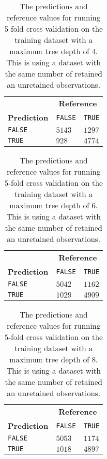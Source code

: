 \begin{table}[H]
  \centering
  \begin{tabular}{l|ll}
    \multicolumn{1}{c|}{} & \multicolumn{2}{c}{\textbf{Reference}} \\
    \textbf{Prediction}   & \texttt{FALSE}       & \texttt{TRUE}   \\ \cline{2-3} 
    \texttt{FALSE}        & $5143$               & $1297$          \\
    \texttt{TRUE}         &  $928$               & $4774$           
  \end{tabular}
  \caption{The predictions and reference values for running 5-fold cross
    validation on the training dataset with a maximum tree depth of 4. This is
    using a dataset with the same number of retained an unretained observations.}
  \label{app:tab:confusion11}
\end{table}

\begin{table}[H]
  \centering
  \begin{tabular}{l|ll}
    \multicolumn{1}{c|}{} & \multicolumn{2}{c}{\textbf{Reference}} \\
    \textbf{Prediction}   & \texttt{FALSE}       & \texttt{TRUE}   \\ \cline{2-3} 
    \texttt{FALSE}        & $5042$               & $1162$          \\
    \texttt{TRUE}         & $1029$               & $4909$           
  \end{tabular}
  \caption{The predictions and reference values for running 5-fold cross
    validation on the training dataset with a maximum tree depth of 6. This is
    using a dataset with the same number of retained an unretained observations.}
  \label{app:tab:confusion22}
\end{table}

\begin{table}[H]
  \centering
  \begin{tabular}{l|ll}
    \multicolumn{1}{c|}{} & \multicolumn{2}{c}{\textbf{Reference}} \\
    \textbf{Prediction}   & \texttt{FALSE}       & \texttt{TRUE}   \\ \cline{2-3} 
    \texttt{FALSE}        & $5053$               & $1174$          \\
    \texttt{TRUE}         & $1018$               & $4897$           
  \end{tabular}
  \caption{The predictions and reference values for running 5-fold cross
    validation on the training dataset with a maximum tree depth of 8. This is
    using a dataset with the same number of retained an unretained observations.}
  \label{app:tab:confusion33}
\end{table}